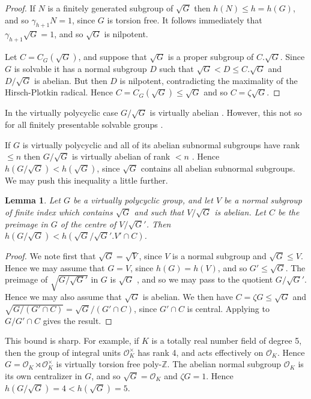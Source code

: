 \documentclass[12pt]{amsart}
\renewcommand{\leq}{\leqslant}
\newtheorem{lemma}[theorem]{Lemma}
\begin{document}
\begin{proof}
If $N$ is a  finitely generated subgroup of $\sqrt{G}$ then $h(N)\leq{h}=h(G)$,
and so $\gamma_{h+1}N=1$, since $G$ is torsion free.
It follows immediately that $\gamma_{h+1}\sqrt{G}=1$, 
and so $\sqrt{G}$ is nilpotent.

Let $C=C_G(\sqrt{G})$, 
and suppose that $\sqrt{G}$ is a proper subgroup of $C.\sqrt{G}$.
Since $G$ is solvable it has a normal subgroup $D$
such that $\sqrt{G}<D\leq{C.\sqrt{G}}$ and $D/\sqrt{G}$ is abelian.
But then $D$ is nilpotent, 
contradicting the maximality of the Hirsch-Plotkin radical.
Hence $C=C_G(\sqrt{G})\leq\sqrt{G}$ and so $C=\zeta\sqrt{G}$.
\end{proof}

In the virtually polycyclic case $G/\sqrt{G}$ is virtually abelian \cite[15.1.6]{Ro}.
However, this not so for all finitely presentable solvable groups \cite{RS}.

If $G$ is virtually polycyclic and all of its abelian subnormal subgroups  
have rank $\leq{n}$ then $G/\sqrt{G}$ is virtually abelian of rank $<n$  
\cite[Theorem 2]{Wi}.
Hence $h(G/\sqrt{G})<h(\sqrt{G})$,
since $\sqrt{G}$ contains all abelian subnormal subgroups.
We may push this inequality a little further.

\begin{lemma}
\label{Wilson}
Let $G$ be a virtually polycyclic group, and let $V$ be a 
normal subgroup of finite index which contains $\sqrt{G}$
and such that $V/\sqrt{G}$ is abelian.
Let $C$ be the preimage in $G$ of the centre of $V/\sqrt{G}'$.
Then $h(G/\sqrt{G})<h(\sqrt{G}/\sqrt{G}'.V'\cap{C})$.
\end{lemma}

\begin{proof}
We note first that $\sqrt{G}=\sqrt{V}$,
since $V$ is a normal subgroup and $\sqrt{G}\leq{V}$.
Hence we may assume that $G=V$, since $h(G)=h(V)$,
and so $G'\leq\sqrt{G}$.
The preimage of $\sqrt{G/\sqrt{G}'}$ in $G$ is $\sqrt{G}$
\cite[5.2.10]{Ro},
and so we may pass to the quotient $G/\sqrt{G}'$.
Hence we may also assume that $\sqrt{G}$ is abelian.
We then have $C=\zeta{G}\leq\sqrt{G}$ and
$\sqrt{G/(G'\cap{C})}=\sqrt{G}/(G'\cap{C})$,
since $G'\cap{C}$ is central.
Applying \cite[Theorem 2]{Wi} to $G/G'\cap{C}$ gives the result.
\end{proof}

This bound is sharp.
For example, if $K$ is a totally real number field of degree 5, 
then the group of integral units $\mathcal{O}_K^\times$ has rank 4,
and acts effectively on $\mathcal{O}_K$.
Hence $G=\mathcal{O}_K\rtimes\mathcal{O}_K^\times$ is 
virtually torsion free poly-$\mathbb{Z}$.
The abelian normal subgroup $\mathcal{O}_K$ is its own centralizer in $G$,
and so $\sqrt{G}=\mathcal{O}_K$ and $\zeta{G}=1$.
Hence  $h(G/\sqrt{G})=4<h(\sqrt{G})=5$.
\end{document}
